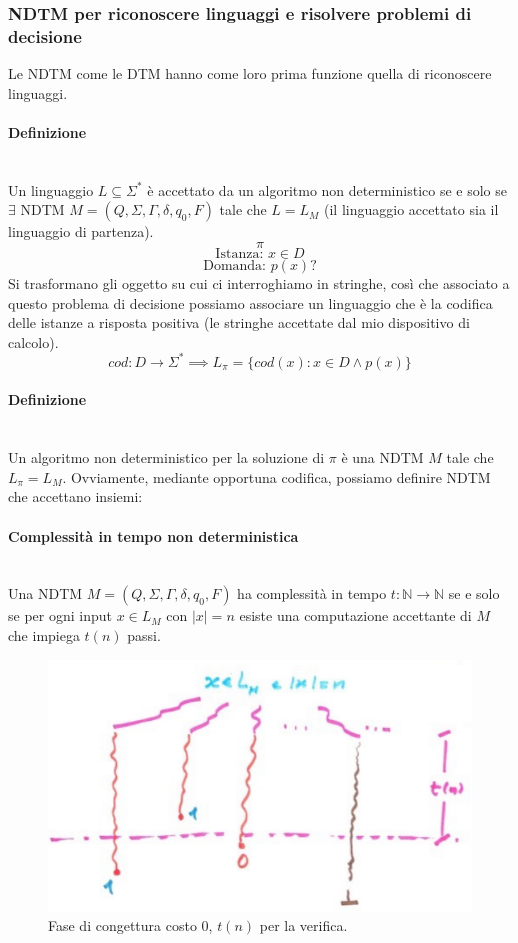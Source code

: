 \documentclass{article}
\begin{document}
\subsubsection{NDTM per riconoscere linguaggi e risolvere problemi di decisione}
Le NDTM come le DTM hanno come loro prima funzione quella di riconoscere linguaggi.
\paragraph{Definizione}\mbox{}\\
Un linguaggio $L\subseteq\Sigma^*$ è accettato da un algoritmo non deterministico
se e solo se $\exists$ NDTM $M=(Q,\Sigma,\Gamma,\delta,q_0,F)$ tale che $L=L_M$ (il
linguaggio accettato sia il linguaggio di partenza).
$$\pi$$
$$\text{Istanza: }x\in D$$
$$\text{Domanda: }p(x)?$$
Si trasformano gli oggetto su cui ci interroghiamo in stringhe, così che associato a questo
problema di decisione possiamo associare un linguaggio che è la codifica delle istanze
a risposta positiva (le stringhe accettate dal mio dispositivo di calcolo).
$$cod:D\rightarrow\Sigma^*\implies L_{\pi}=\{cod(x):x\in D\land p(x)\}$$

\paragraph{Definizione}\mbox{}\\
Un algoritmo non deterministico per la soluzione di $\pi$ è una NDTM $M$ tale che $L_\pi=L_M$.
Ovviamente, mediante opportuna codifica, possiamo definire NDTM che accettano insiemi:
\paragraph{Complessità in tempo non deterministica}\mbox{}\\
Una NDTM $M=(Q,\Sigma,\Gamma,\delta,q_0,F)$ ha complessità in tempo $t:\mathbb{N}\rightarrow\mathbb{N}$
se e solo se per ogni input $x\in L_M$ con $|x|=n$ esiste una computazione accettante di $M$
che impiega $t(n)$ passi.
\begin{figure}[H]
    \centering
    \includegraphics[scale=0.6]{images/ndtmcomplex.png}
    \caption{Fase di congettura costo 0, $t(n)$ per la verifica.}
\end{figure}
\end{document}
